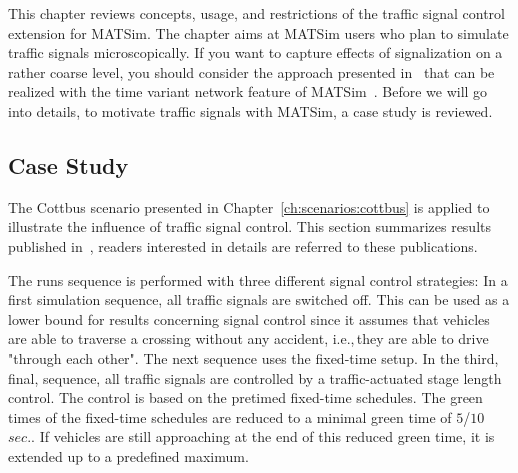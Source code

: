 This chapter reviews concepts, usage, and restrictions of the traffic signal control extension for MATSim. 
The chapter aims at MATSim users who plan to simulate traffic signals microscopically. 
If you want to capture effects of signalization on a rather coarse level, you should consider the approach presented in~\citet[pp.~139][]{Charypar2008PhD} that can be realized with the time variant network feature of MATSim~\citep{LaemmelGretherNagel2009TimeDependentNetworks}. 
Before we will go into details, to motivate traffic signals with MATSim, a case study is reviewed. 

\subsection{Case Study}

The Cottbus scenario presented in Chapter~\ref{ch:scenarios:cottbus} is applied to illustrate the influence of traffic signal control. 
This section summarizes results published in~\citet{GretherBischoffNagel2011CottbusSylviaEventAbstract,Grether2014PhD}, readers interested in details are referred to these publications. 

%
The runs sequence is performed with three different signal control strategies:
%
In a first simulation sequence, all traffic signals are switched off. This can be used as a lower bound for results concerning signal control since it assumes that vehicles are able to traverse a crossing without any accident, i.e.,\,they are able to drive "through each other". 
%
The next sequence uses the fixed-time setup. 
%
In the third, final, sequence, all traffic signals are controlled by a traffic-actuated stage length control. 
The control is based on the pretimed fixed-time schedules. 
The green times of the fixed-time schedules are reduced to a minimal green time of $5$/$10$ $sec.$. 
If vehicles are still approaching at the end of this reduced green time, it is extended up to a predefined maximum. 

